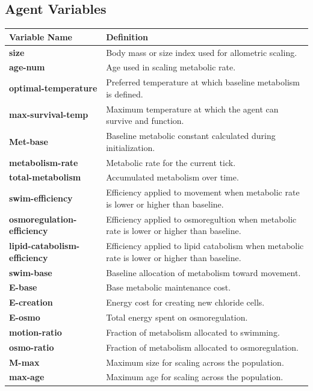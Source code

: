 \documentclass[
]{book}
\begin{document}
\subsection{Agent Variables}\label{agent-variables}

\begin{longtable}[]{@{}
  >{\raggedright\arraybackslash}p{}
  >{\raggedright\arraybackslash}p{}@{}}
\toprule\noalign{}
\begin{minipage}[b]{\linewidth}\raggedright
Variable Name
\end{minipage} & \begin{minipage}[b]{\linewidth}\raggedright
Definition
\end{minipage} \\
\midrule\noalign{}
\endhead
\bottomrule\noalign{}
\endlastfoot
\textbf{size} & Body mass or size index used for allometric scaling. \\
\textbf{age-num} & Age used in scaling metabolic rate. \\
\textbf{optimal-temperature} & Preferred temperature at which baseline metabolism is defined. \\
\textbf{max-survival-temp} & Maximum temperature at which the agent can survive and function. \\
\textbf{Met-base} & Baseline metabolic constant calculated during initialization. \\
\textbf{metabolism-rate} & Metabolic rate for the current tick. \\
\textbf{total-metabolism} & Accumulated metabolism over time. \\
\textbf{swim-efficiency} & Efficiency applied to movement when metabolic rate is lower or higher than baseline. \\
\textbf{osmoregulation-efficiency} & Efficiency applied to osmoregultion when metabolic rate is lower or higher than baseline. \\
\textbf{lipid-catabolism-efficiency} & Efficiency applied to lipid catabolism when metabolic rate is lower or higher than baseline. \\
\textbf{swim-base} & Baseline allocation of metabolism toward movement. \\
\textbf{E-base} & Base metabolic maintenance cost. \\
\textbf{E-creation} & Energy cost for creating new chloride cells. \\
\textbf{E-osmo} & Total energy spent on osmoregulation. \\
\textbf{motion-ratio} & Fraction of metabolism allocated to swimming. \\
\textbf{osmo-ratio} & Fraction of metabolism allocated to osmoregulation. \\
\textbf{M-max} & Maximum size for scaling across the population. \\
\textbf{max-age} & Maximum age for scaling across the population. \\
\end{longtable}
\end{document}
